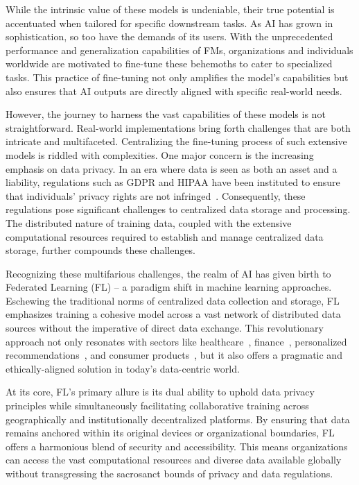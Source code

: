 \documentclass[withindex,glossary,firstyr]{cam-thesis}
\begin{document}
While the intrinsic value of these models is undeniable, their true potential is accentuated when tailored for specific downstream tasks. As AI has grown in sophistication, so too have the demands of its users. With the unprecedented performance and generalization capabilities of FMs, organizations and individuals worldwide are motivated to fine-tune these behemoths to cater to specialized tasks. This practice of fine-tuning not only amplifies the model's capabilities but also ensures that AI outputs are directly aligned with specific real-world needs.

However, the journey to harness the vast capabilities of these models is not straightforward. Real-world implementations bring forth challenges that are both intricate and multifaceted. Centralizing the fine-tuning process of such extensive models is riddled with complexities. One major concern is the increasing emphasis on data privacy. In an era where data is seen as both an asset and a liability, regulations such as GDPR and HIPAA have been instituted to ensure that individuals' privacy rights are not infringed~\cite{villalobos2022run}. Consequently, these regulations pose significant challenges to centralized data storage and processing. The distributed nature of training data, coupled with the extensive computational resources required to establish and manage centralized data storage, further compounds these challenges.

Recognizing these multifarious challenges, the realm of AI has given birth to Federated Learning (FL) – a paradigm shift in machine learning approaches. Eschewing the traditional norms of centralized data collection and storage, FL emphasizes training a cohesive model across a vast network of distributed data sources without the imperative of direct data exchange. This revolutionary approach not only resonates with sectors like healthcare~\cite{li2019privacypreserving}, finance~\cite{zhang2023privacypreserving}, personalized recommendations~\cite{10.1145/3394486.3403176}, and consumer products~\cite{hard2019federated}, but it also offers a pragmatic and ethically-aligned solution in today's data-centric world.

At its core, FL's primary allure is its dual ability to uphold data privacy principles while simultaneously facilitating collaborative training across geographically and institutionally decentralized platforms. By ensuring that data remains anchored within its original devices or organizational boundaries, FL offers a harmonious blend of security and accessibility. This means organizations can access the vast computational resources and diverse data available globally without transgressing the sacrosanct bounds of privacy and data regulations.
\end{document}
